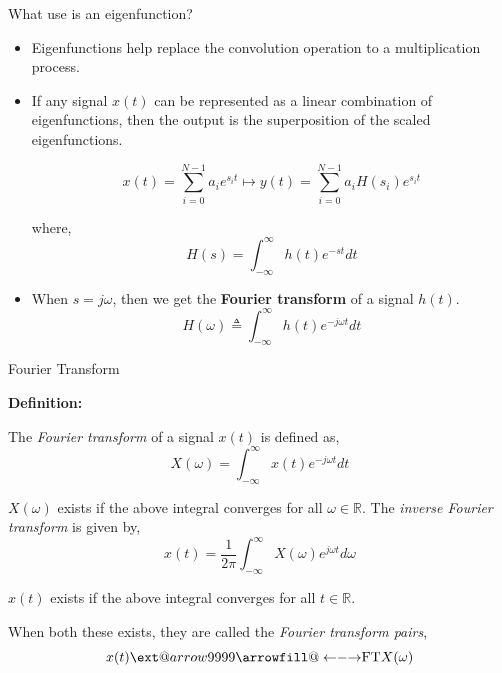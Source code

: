\documentclass{beamer}
\makeatletter
\newcommand\xleftrightarrow[2][]{%
  \ext@arrow 9999{\longleftrightarrowfill@}{#1}{#2}}
\newcommand\longleftrightarrowfill@{%
  \arrowfill@\leftarrow\relbar\rightarrow}
\makeatother
\begin{document}
\begin{frame}{What use is an eigenfunction?}

\begin{itemize}
\item Eigenfunctions help replace the convolution operation to a multiplication process.

\item If any signal $x(t)$ can be represented as a linear combination of eigenfunctions, then the output is the superposition of the scaled eigenfunctions.

\[ x(t) = \sum_{i=0}^{N-1} a_ie^{s_{i}t} \mapsto y(t) = \sum_{i=0}^{N-1} a_iH(s_i)e^{s_{i}t} \]

where, 
\[ H(s) = \int_{-\infty}^{\infty}h(t)e^{-st}dt \]

\item When $s=j\omega$, then we get the \textbf{Fourier transform} of a signal $h(t)$.
\[ H(\omega) \triangleq \int_{-\infty}^{\infty}h(t)e^{-j\omega t}dt \]
\end{itemize}
\end{frame}

\begin{frame}{Fourier Transform}

\textbf{Definition:}

The \textit{Fourier transform} of a signal $x(t)$ is defined as,
\[ X(\omega) = \int_{-\infty}^{\infty}x(t)e^{-j\omega t}dt \]

$X(\omega)$ exists if the above integral converges for all $\omega \in \mathbb{R}$. The \textit{inverse Fourier transform} is given by,
\[ x(t) = \frac{1}{2\pi}\int_{-\infty}^{\infty}X(\omega)e^{j\omega t}d\omega \]

$x\left(t\right)$ exists if the above integral converges for all $t \in \mathbb{R}$.

When both these exists, they are called the \textit{Fourier transform pairs},
\[ x(t) \xleftrightarrow{\text{FT}} X(\omega) \]

\end{frame}
\end{document}
